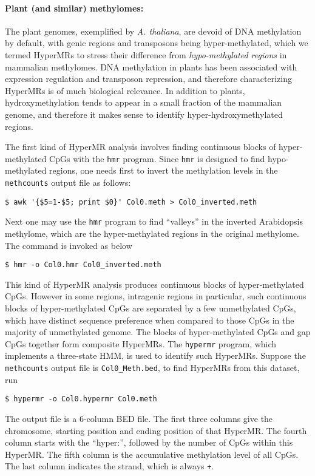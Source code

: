 \documentclass[10pt]{article}
\newcommand{\prog}[1]{\texttt{#1}}
\newcommand{\fn}[1]{\texttt{#1}}
\newcommand{\lit}[1]{\texttt{#1}}
\begin{document}


\paragraph{Plant (and similar) methylomes:} 
The plant genomes, exemplified by \textit{A. thaliana}, are devoid of
DNA methylation by default, with genic regions and transposons being
hyper-methylated, which we termed HyperMRs to stress their difference
from \textit{hypo-methylated regions} in mammalian methylomes. DNA
methylation in plants has been associated with expression regulation
and transposon repression, and therefore characterizing HyperMRs is of
much biological relevance. In addition to plants, hydroxymethylation
tends to appear in a small fraction of the mammalian genome, and therefore
it makes sense to identify hyper-hydroxymethylated regions.

The first kind of HyperMR analysis involves finding continuous blocks
of hyper-methylated CpGs with the \prog{hmr} program. Since \prog{hmr}
is designed to find hypo-methylated regions, one needs first to invert
the methylation levels in the \prog{methcounts} output file as
follows:
\begin{verbatim}
$ awk '{$5=1-$5; print $0}' Col0.meth > Col0_inverted.meth
\end{verbatim}
Next one may use the \prog{hmr} program to find ``valleys'' in the
inverted Arabidopsis methylome, which are the hyper-methylated regions
in the original methylome. The command is invoked as below
\begin{verbatim}
$ hmr -o Col0.hmr Col0_inverted.meth
\end{verbatim}

This kind of HyperMR analysis produces continuous blocks of
hyper-methylated CpGs. However in some regions, intragenic regions in
particular, such continuous blocks of hyper-methylated CpGs are
separated by a few unmethylated CpGs, which have distinct sequence
preference when compared to those CpGs in the majority of unmethylated
genome. The blocks of hyper-methylated CpGs and gap CpGs together form
composite HyperMRs. The \prog{hypermr} program, which implements a
three-state HMM, is used to identify such HyperMRs. Suppose the
\prog{methcounts} output file is \fn{Col0\_Meth.bed}, to find HyperMRs
from this dataset, run
\begin{verbatim}
$ hypermr -o Col0.hypermr Col0.meth
\end{verbatim}
The output file is a 6-column BED file. The first three columns give
the chromosome, starting position and ending position of that
HyperMR. The fourth column starts with the ``hyper:'', followed by the
number of CpGs within this HyperMR. The fifth column is the
accumulative methylation level of all CpGs. The last column indicates
the strand, which is always \lit{+}.
\end{document}
